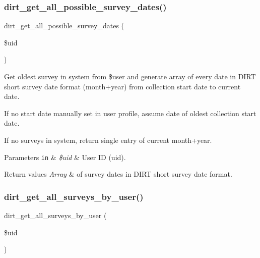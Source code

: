 \subsubsection{\texorpdfstring{dirt\+\_\+get\+\_\+all\+\_\+possible\+\_\+survey\+\_\+dates()}{dirt\_get\_all\_possible\_survey\_dates()}}
{\footnotesize\ttfamily dirt\+\_\+get\+\_\+all\+\_\+possible\+\_\+survey\+\_\+dates (\begin{DoxyParamCaption}\item[{}]{\$uid }\end{DoxyParamCaption})}

Get oldest survey in system from \$user and generate array of every date in D\+I\+RT short survey date format (month+year) from collection start date to current date.

If no start date manually set in user profile, assume date of oldest collection start date.

If no surveys in system, return single entry of current month+year.


\begin{DoxyParams}[1]{Parameters}
\mbox{\tt in}  & {\em \$uid} & User ID (uid).\\
\hline
\end{DoxyParams}

\begin{DoxyRetVals}{Return values}
{\em Array} & of survey dates in D\+I\+RT short survey date format. \\
\hline
\end{DoxyRetVals}
\mbox{\label{dirt_8data__entry__portal_8inc_afebafe4c940cc0c88fd34369b8478af7}} 
\subsubsection{\texorpdfstring{dirt\+\_\+get\+\_\+all\+\_\+surveys\+\_\+by\+\_\+user()}{dirt\_get\_all\_surveys\_by\_user()}}
{\footnotesize\ttfamily dirt\+\_\+get\+\_\+all\+\_\+surveys\+\_\+by\+\_\+user (\begin{DoxyParamCaption}\item[{}]{\$uid }\end{DoxyParamCaption})}

